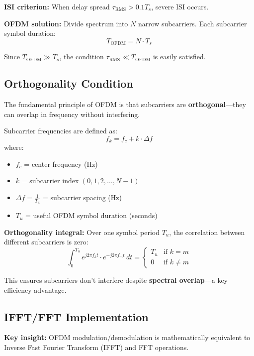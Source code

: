 \textbf{ISI criterion:} When delay spread $\tau_{\mathrm{RMS}} > 0.1 T_s$, severe ISI occurs.

\textbf{OFDM solution:} Divide spectrum into $N$ narrow subcarriers. Each subcarrier symbol duration:
\begin{equation}
T_{\mathrm{OFDM}} = N \cdot T_s
\end{equation}

Since $T_{\mathrm{OFDM}} \gg T_s$, the condition $\tau_{\mathrm{RMS}} \ll T_{\mathrm{OFDM}}$ is easily satisfied.

\subsection{Orthogonality Condition}

The fundamental principle of OFDM is that subcarriers are \textbf{orthogonal}---they can overlap in frequency without interfering.

Subcarrier frequencies are defined as:
\begin{equation}
f_k = f_c + k \cdot \Delta f
\end{equation}
where:
\begin{itemize}
\item $f_c$ = center frequency (Hz)
\item $k$ = subcarrier index $(0, 1, 2, \ldots, N-1)$
\item $\Delta f = \frac{1}{T_u}$ = subcarrier spacing (Hz)
\item $T_u$ = useful OFDM symbol duration (seconds)
\end{itemize}

\textbf{Orthogonality integral:} Over one symbol period $T_u$, the correlation between different subcarriers is zero:
\begin{equation}
\int_0^{T_u} e^{j2\pi f_k t} \cdot e^{-j2\pi f_m t} \, dt = \begin{cases}
T_u & \text{if } k = m \\
0 & \text{if } k \neq m
\end{cases}
\end{equation}

This ensures subcarriers don't interfere despite \textbf{spectral overlap}---a key efficiency advantage.

\subsection{IFFT/FFT Implementation}

\textbf{Key insight:} OFDM modulation/demodulation is mathematically equivalent to Inverse Fast Fourier Transform (IFFT) and FFT operations.

